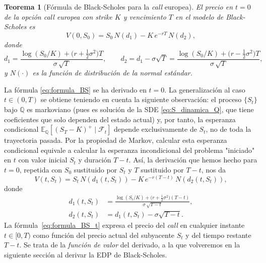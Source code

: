 \documentclass[11pt,a4paper,oneside]{report}
\theoremstyle{plain}
\newtheorem{teorema}{Teorema}[chapter]
\theoremstyle{definition}
\theoremstyle{remark}
\newcommand{\E}{\mathbb{E}}
\newcommand{\Q}{\mathbb{Q}}
\newcommand{\F}{\mathcal{F}}
\newcommand{\1}{\mathbf{1}}
\begin{document}
\begin{teorema}[Fórmula de Black-Scholes para la \emph{call} europea]
\label{teo:formula_BS}
El precio en $t = 0$ de la opción \emph{call} europea con \emph{strike}
$K$ y vencimiento $T$ en el modelo de Black-Scholes es
\begin{equation}\label{eq:formula_BS}
  \boxed{\;
    V(0, S_0) = S_0\, N(d_1) - K\, e^{-rT}\, N(d_2),
  \;}
\end{equation}
donde
\begin{equation*}
  d_1 = \frac{\log(S_0/K) + \bigl(r + \tfrac{1}{2}\sigma^2\bigr) T}
              {\sigma\, \sqrt{T}},
  \qquad
  d_2 = d_1 - \sigma\sqrt{T}
      = \frac{\log(S_0/K) + \bigl(r - \tfrac{1}{2}\sigma^2\bigr) T}
              {\sigma\, \sqrt{T}},
\end{equation*}
y $N(\cdot)$ es la función de distribución de la normal estándar.
\end{teorema}

La fórmula
\eqref{eq:formula_BS} se ha derivado en $t = 0$. La generalización al
caso $t \in (0, T)$ se obtiene teniendo en cuenta la siguiente observación: el
proceso $\{S_t\}$ bajo $\Q$ es markoviano (pues es solución de la SDE
\eqref{eq:S_dinamica_Q}, que tiene coeficientes que solo dependen del estado
actual) y, por tanto, la esperanza condicional
$\E_\Q[(S_T - K)^+ \mid \F_t]$ depende exclusivamente de $S_t$, no de
toda la trayectoria pasada. Por la propiedad de Markov, calcular esta
esperanza condicional equivale a calcular la esperanza incondicional
del problema "iniciado" en $t$ con valor inicial $S_t$ y duración $T -
t$. Así, la derivación que hemos hecho para $t = 0$, repetida con $S_0$ sustituido por
$S_t$ y $T$ sustituido por $T - t$, nos da
\begin{equation}\label{eq:formula_BS_t}
  \boxed{\;
    V(t, S_t) = S_t\, N(d_1(t, S_t)) - K\, e^{-r(T-t)}\, N(d_2(t, S_t)),
  \;}
\end{equation}
donde
\begin{align*}
  d_1(t, S_t) &= \frac{\log(S_t/K) + \bigl(r + \tfrac{1}{2}\sigma^2\bigr)(T-t)}
                       {\sigma\, \sqrt{T-t}}, \\
  d_2(t, S_t) &= d_1(t, S_t) - \sigma\sqrt{T-t}.
\end{align*}
La fórmula~\eqref{eq:formula_BS_t} expresa el precio del \emph{call}
en cualquier instante $t \in [0, T)$ como función del precio actual
del subyacente $S_t$ y del tiempo restante $T - t$. Se trata de la \emph{función
de valor} del derivado, a la que volveremos en la siguiente sección al derivar la EDP de Black-Scholes.
\end{document}
